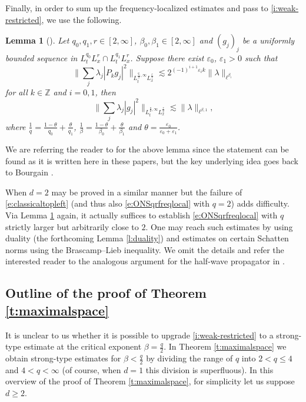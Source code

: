 \documentclass[a4paper]{amsart}
\numberwithin{equation}{section}%
\theoremstyle{plain}%
\newtheorem{lemma}[theorem]{Lemma}
\theoremstyle{definition}
\theoremstyle{remark}%
\begin{document}
Finally, in order to sum up the frequency-localized estimates and pass to \eqref{i:weak-restricted}, we use the following. 
\begin{lemma}[\cite{BHLNS, BKS_RIMS}]\label{l:Bourgain's trick}
Let $q_0, q_1,r \in [2,\infty]$, $\beta_0, \beta_1 \in [2,\infty]$ and $(g_j)_j$ be a uniformly bounded sequence in $L_t^{q_0}L_x^{r}\cap L_t^{q_1}L_x^{r}$. Suppose there exist $\varepsilon_0$, $\varepsilon_1>0$ such that 
\[
\bigg\|\sum_j\lambda_j|P_kg_j|^2\bigg\|_{L_t^{\frac{q_i}{2},\infty}L_x^{\frac{r}{2}}}\lesssim 2^{(-1)^{i+1}\varepsilon_ik}\|\lambda\|_{\ell^{\beta_i}}
\]
for all $k\in\mathbb{Z}$ and $i=0,1$, then
\[
\bigg\|\sum_j\lambda_j|g_j|^2\bigg\|_{L_t^{\frac{q}{2},\infty}L_x^{\frac{r}{2}}}\lesssim \|\lambda\|_{\ell^{\beta,1}},
\]
where $\frac{1}{q}=\frac{1-\theta}{q_0}+\frac{\theta}{q_1}$, $\frac{1}{\beta}=\frac{1-\theta}{\beta_0}+\frac{\theta}{\beta_1}$ and $\theta=\frac{\varepsilon_0}{\varepsilon_0+\varepsilon_1}$.
\end{lemma}
We are referring the reader to \cite{BHLNS, BKS_RIMS} for the above lemma since the statement can be found as it is written here in these papers, but the key underlying idea goes back to Bourgain \cite{Bourgaintrick}.

When $d = 2$ may be proved in a similar manner but the failure of \eqref{e:classicaltopleft} (and thus also \eqref{e:ONSqrfreqlocal} with $q = 2$) adds difficulty. Via Lemma \ref{l:Bourgain's trick} again, it actually suffices to establish \eqref{e:ONSqrfreqlocal} with $q$ strictly larger but arbitrarily close to $2$. One may reach such estimates by using duality (the forthcoming Lemma \ref{l:duality}) and estimates on certain Schatten norms using the Brascamp--Lieb inequality. We omit the details and refer the interested reader to the analogous argument for the half-wave propagator in \cite{BKS_RIMS}.


 \subsection{Outline of the proof of Theorem \ref{t:maximalspace}} \label{subsection:Outline}
It is unclear to us whether it is possible to upgrade \eqref{i:weak-restricted} to a strong-type estimate at the critical exponent $\beta = \frac{q}{2}$. In Theorem \ref{t:maximalspace} we obtain strong-type estimates for $\beta < \frac{q}{2}$ by dividing the range of $q$ into $2<q\leq4$ and $4 < q<\infty$ (of course, when $d=1$ this division is superfluous). In this overview of the proof of Theorem \ref{t:maximalspace}, for simplicity let us suppose $d \geq 2$.
\end{document}
